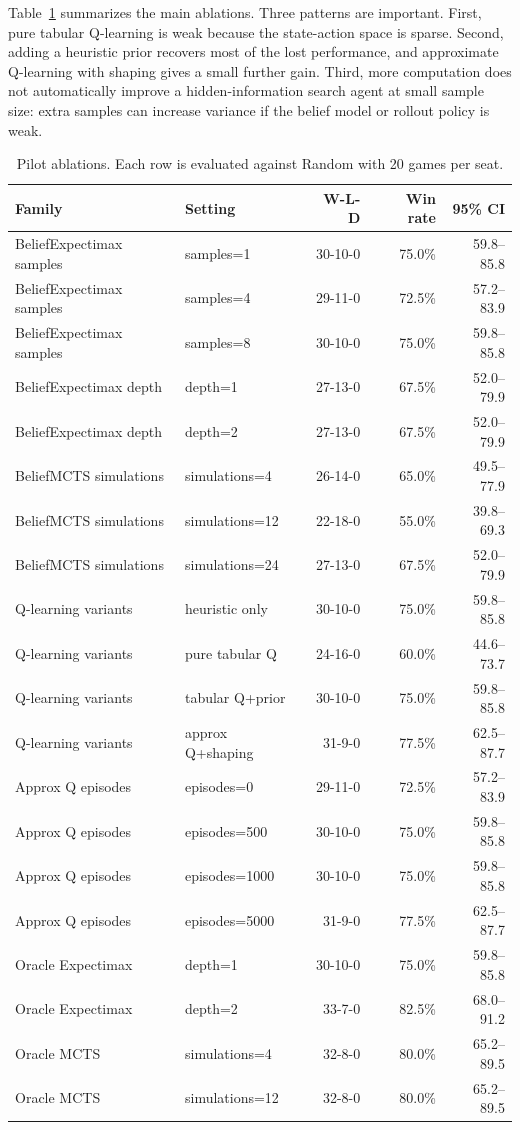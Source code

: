 \documentclass[10pt,twocolumn]{article}
\begin{document}
Table~\ref{tab:ablations} summarizes the main ablations. Three patterns are
important. First, pure tabular Q-learning is weak because the state-action
space is sparse. Second, adding a heuristic prior recovers most of the lost
performance, and approximate Q-learning with shaping gives a small further
gain. Third, more computation does not automatically improve a
hidden-information search agent at small sample size: extra samples can
increase variance if the belief model or rollout policy is weak.

\begin{table}[t]
\centering
\caption{Pilot ablations. Each row is evaluated against Random with 20 games per seat.}
\label{tab:ablations}
\begin{tabular}{llrrr}
\toprule
Family & Setting & W-L-D & Win rate & 95\% CI\\
\midrule
BeliefExpectimax samples & samples=1 & 30-10-0 & 75.0\% & 59.8--85.8\\
BeliefExpectimax samples & samples=4 & 29-11-0 & 72.5\% & 57.2--83.9\\
BeliefExpectimax samples & samples=8 & 30-10-0 & 75.0\% & 59.8--85.8\\
BeliefExpectimax depth & depth=1 & 27-13-0 & 67.5\% & 52.0--79.9\\
BeliefExpectimax depth & depth=2 & 27-13-0 & 67.5\% & 52.0--79.9\\
BeliefMCTS simulations & simulations=4 & 26-14-0 & 65.0\% & 49.5--77.9\\
BeliefMCTS simulations & simulations=12 & 22-18-0 & 55.0\% & 39.8--69.3\\
BeliefMCTS simulations & simulations=24 & 27-13-0 & 67.5\% & 52.0--79.9\\
Q-learning variants & heuristic only & 30-10-0 & 75.0\% & 59.8--85.8\\
Q-learning variants & pure tabular Q & 24-16-0 & 60.0\% & 44.6--73.7\\
Q-learning variants & tabular Q+prior & 30-10-0 & 75.0\% & 59.8--85.8\\
Q-learning variants & approx Q+shaping & 31-9-0 & 77.5\% & 62.5--87.7\\
Approx Q episodes & episodes=0 & 29-11-0 & 72.5\% & 57.2--83.9\\
Approx Q episodes & episodes=500 & 30-10-0 & 75.0\% & 59.8--85.8\\
Approx Q episodes & episodes=1000 & 30-10-0 & 75.0\% & 59.8--85.8\\
Approx Q episodes & episodes=5000 & 31-9-0 & 77.5\% & 62.5--87.7\\
Oracle Expectimax & depth=1 & 30-10-0 & 75.0\% & 59.8--85.8\\
Oracle Expectimax & depth=2 & 33-7-0 & 82.5\% & 68.0--91.2\\
Oracle MCTS & simulations=4 & 32-8-0 & 80.0\% & 65.2--89.5\\
Oracle MCTS & simulations=12 & 32-8-0 & 80.0\% & 65.2--89.5\\
\bottomrule
\end{tabular}
\end{table}
\end{document}
